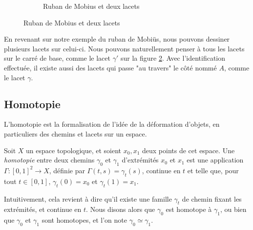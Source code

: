 \begin{exemple}
\begin{figure}[H]
\begin{subfigure}[b]{0.45\linewidth}
\caption{Ruban de Mobius et deux lacets}
\label{tkz:mobius-loops}
\end{subfigure}
\end{figure}
En revenant sur notre exemple du ruban de Mobiüs, nous pouvons dessiner plusieurs lacets sur celui-ci. Nous pouvons naturellement penser à tous les lacets sur le carré de base, comme le lacet $\gamma'$ sur la figure \ref{tkz:mobius-loops}. Avec l'identification effectuée, il existe aussi des lacets qui passe "au travers" le côté nommé $A$, comme le lacet $\gamma$.
\end{exemple}

\subsection{Homotopie}\label{sec:homotopy}

L'homotopie est la formalisation de l'idée de la déformation d'objets, en particuliers des chemins et lacets sur un espace.

\begin{definition}\label{def:homotopy-paths}
Soit $X$ un espace topologique, et soient $x_0, x_1$ deux points de cet espace. Une \emph{homotopie} entre deux chemins $\gamma_0$ et $\gamma_1$ d'extrémités $x_0$ et $x_1$ est une application $\Gamma:[0,1]^2\to X$, définie par $\Gamma(t,s)=\gamma_t(s)$, continue en $t$ et telle que, pour tout $t\in[0,1]$, $\gamma_t(0)=x_0$ et $\gamma_t(1)=x_1$.

Intuitivement, cela revient à dire qu'il existe une famille $\gamma_t$ de chemin fixant les extrémités, et continue en $t$. Nous disons alors que $\gamma_0$ est homotope à $\gamma_1$, ou bien que $\gamma_0$ et $\gamma_1$ sont homotopes, et l'on note $\gamma_0\simeq\gamma_1$.
\end{definition}

